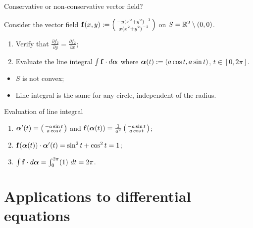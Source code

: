 {Conservative or non-conservative vector field?}


\begin{example}
    Consider the vector field \(\mathbf{f}(x,y) := \left(\begin{smallmatrix}
        -y {(x^2 + y^2)}^{-1} \\ x {(x^2 + y^2)}^{-1}
    \end{smallmatrix}\right)\)
    on \(S = \mathbb{R}^2 \setminus (0,0)\).
    \begin{enumerate}
        \item Verify that \(  \tfrac{\partial f_2}{\partial y} = \tfrac{\partial f_2}{\partial x}\);
        \item Evaluate the line integral \(\int \mathbf{f} \cdot d\boldsymbol{\alpha}\) where \(\boldsymbol{\alpha}(t) := (a \cos t, a \sin t)\), \(t\in [0,2\pi]\).
    \end{enumerate}

\end{example}


\begin{itemize}
    \item \(S\) is not convex;
    \item Line integral is the same for any circle, independent of the radius.
\end{itemize}


{Evaluation of line integral}


\begin{enumerate}
    \item \(\boldsymbol{\alpha}'(t) = \left(\begin{smallmatrix}
                  -a \sin t \\ a \cos t
              \end{smallmatrix}\right)\) and \(\mathbf{f}(\boldsymbol{\alpha}(t)) = \frac{1}{a^2} \left(\begin{smallmatrix}
                  -a \sin t \\ a \cos t
              \end{smallmatrix}\right)   \);
    \item \(\mathbf{f}(\boldsymbol{\alpha}(t)) \cdot \boldsymbol{\alpha}'(t) = \sin^2 t + \cos^2 t = 1  \);
    \item \(\int \mathbf{f} \cdot d\boldsymbol{\alpha} = \int_{0}^{2\pi} (1) \ dt = 2\pi \).
\end{enumerate}



\section{Applications to differential equations}



